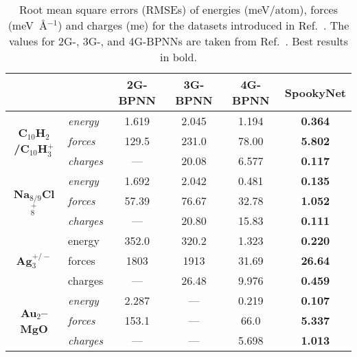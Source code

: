 \documentclass[%
superscriptaddress,
reprint,
nofootinbib,
amsmath,amssymb,amsfonts,
floatfix,
altaffilletter,
showkeys,
]{revtex4-2}
\newcommand{\nn}{SpookyNet}
\begin{document}
\begin{table*}
	\begin{tabular}{c l c c c c}
		\toprule
		& & \bf 2G-BPNN & \bf 3G-BPNN & \bf 4G-BPNN & \bf \nn{} \\
		\midrule
		\multirow{3}{*}{\bf C$_{10}$H$_2$/C$_{10}$H$_3^+$} & \it energy & 1.619 & 2.045 & 1.194 & \bf 0.364 \\
		& \it forces & 129.5 & 231.0 & 78.00 & \bf 5.802 \\
		& \it charges & --- & 20.08 & 6.577 & \bf 0.117\\
		\midrule
		\multirow{3}{*}{\bf Na$_{8/9}$Cl$_8^+$} & \it energy & 1.692 & 2.042 & 0.481 & \bf 0.135 \\
		& \it forces & 57.39 & 76.67 & 32.78 & \bf 1.052 \\
		& \it charges & --- & 20.80 & 15.83 & \bf 0.111\\
		\midrule
		\multirow{3}{*}{\bf Ag$_3^{+/-}$} & energy & 352.0 & 320.2 & 1.323 & \bf 0.220 \\
		& forces & 1803 & 1913 & 31.69 & \bf 26.64\\
		& charges & --- & 26.48 & 9.976 & \bf 0.459\\
		\midrule
		\multirow{3}{*}{\bf Au$_2$--MgO} &  \it energy & 2.287 & --- & 0.219 & \bf 0.107 \\
		& \it forces & 153.1 & --- & 66.0 & \bf 5.337 \\
		& \it charges & --- & --- & 5.698 & \bf 1.013\\
		\bottomrule
	\end{tabular}
	\caption{Root mean square errors (RMSEs) of energies (meV/atom), forces
		(meV~\AA$^{-1}$) and charges (me) for the datasets introduced in Ref.~. The values for 2G-, 3G-, and 4G-BPNNs are taken from Ref.~. Best results in bold.}
	\label{tab:behler_results}
\end{table*}
\end{document}
